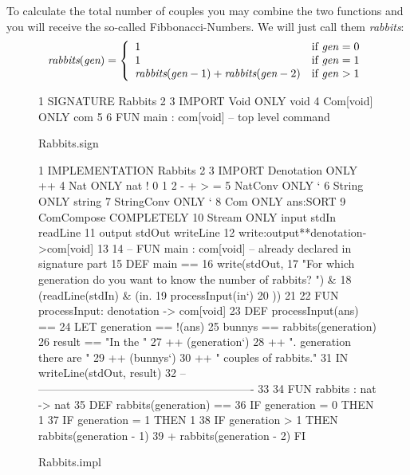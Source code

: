 To calculate the total number of couples you may combine the two
functions and you will receive the so-called Fibbonacci-Numbers. 
We will just call them {\em rabbits\/}:
\[ \mbox{\em rabbits}(\mbox{\em gen}) = \left\{ \begin{array}{ll}
1 & \mbox{if\ {\em gen\/}} = 0\\
1 & \mbox{if\ {\em gen\/}} = 1\\
\mbox{\em rabbits}(\mbox{\em gen}-1) + \mbox{\em rabbits}(\mbox{\em gen}-2) & \mbox{if\ {\em gen\/}} > 1\\
\end{array}\right. 
\]


\begin{figure}[hbtp]
  \leavevmode
  \begin{center}
    \begin{prog}
   1    SIGNATURE Rabbits
   2
   3    IMPORT  Void            ONLY void
   4            Com[void]       ONLY com
   5
   6    FUN main : com[void]    -- top level command
    \end{prog}
    \caption{Rabbits.sign}
  \end{center}
\end{figure}

\begin{figure}[hbtp]
  \leavevmode
  \begin{prog}
   1    IMPLEMENTATION Rabbits
   2
   3    IMPORT  Denotation      ONLY  ++
   4            Nat             ONLY nat ! 0 1 2 - + > =
   5            NatConv         ONLY `
   6            String          ONLY string
   7            StringConv      ONLY `
   8            Com             ONLY ans:SORT
   9            ComCompose      COMPLETELY
  10            Stream          ONLY input stdIn readLine
  11                               output stdOut writeLine
  12                               write:output**denotation->com[void]
  13
  14    -- FUN main : com[void] -- already declared in signature part
  15    DEF main ==
  16        write(stdOut,
  17           "For which generation do you want 
                        to know the number of rabbits? ") &
  18        (readLine(stdIn)    & (\LAMBDA in.
  19         processInput(in`)
  20        ))
  21
  22    FUN processInput: denotation -> com[void]
  23    DEF processInput(ans) ==
  24              LET generation == !(ans)
  25                  bunnys     == rabbits(generation)
  26                  result     == "In the "
  27                                ++ (generation`)
  28                                ++ ". generation there are "
  29                                ++ (bunnys`)
  30                                ++ " couples of rabbits."
  31              IN writeLine(stdOut, result)
  32    -- ----------------------------------------------------------
  33
  34    FUN rabbits : nat -> nat
  35    DEF rabbits(generation) ==
  36            IF generation = 0 THEN 1
  37            IF generation = 1 THEN 1
  38            IF generation > 1 THEN rabbits(generation - 1)
  39                                   + rabbits(generation - 2) FI
 \end{prog}
    \caption{Rabbits.impl}
  \label{fig:rabbits}
\end{figure}

